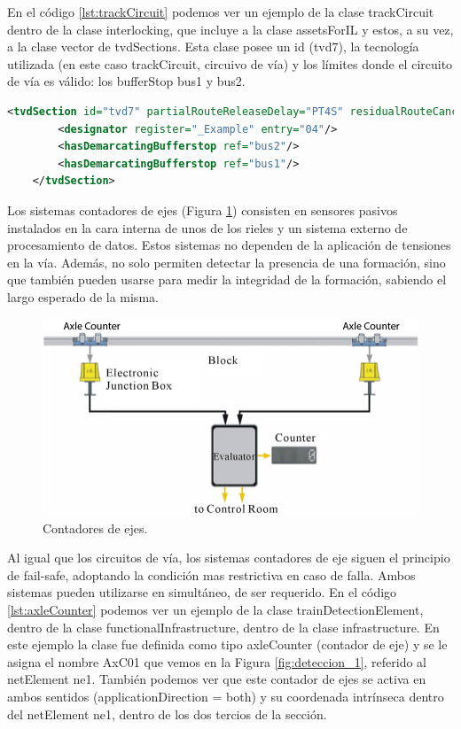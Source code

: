     En el código \ref{lst:trackCircuit} podemos ver un ejemplo de la clase trackCircuit dentro de la clase interlocking, que incluye a la clase assetsForIL y estos, a su vez, a la clase vector de tvdSections. Esta clase posee un id (tvd7), la tecnología utilizada (en este caso trackCircuit, circuivo de vía) y los límites donde el circuito de vía es válido: los bufferStop bus1 y bus2.

    \begin{lstlisting}[language = XML, caption = Clase trackCircuit , label = {lst:trackCircuit}]
    <tvdSection id="tvd7" partialRouteReleaseDelay="PT4S" residualRouteCancellationDelay="PT90S" technology="trackCircuit" isBerthingTrack="false">
        <designator register="_Example" entry="04"/>
        <hasDemarcatingBufferstop ref="bus2"/>
        <hasDemarcatingBufferstop ref="bus1"/>
    </tvdSection>
    \end{lstlisting}

    Los sistemas contadores de ejes (Figura \ref{fig:deteccion_2}) consisten en sensores pasivos instalados en la cara interna de unos de los rieles y un sistema externo de procesamiento de datos. Estos sistemas no dependen de la aplicación de tensiones en la vía. Además, no solo permiten detectar la presencia de una formación, sino que también pueden usarse para medir la integridad de la formación, sabiendo el largo esperado de la misma. 

    \begin{figure}[!h]
        \centering
        \includegraphics[width=1\textwidth]{Figuras/contador.jpg}
        \centering\caption{Contadores de ejes.}
        \label{fig:deteccion_2}
    \end{figure}

    Al igual que los circuitos de vía, los sistemas contadores de eje siguen el principio de fail-safe, adoptando la condición mas restrictiva en caso de falla. Ambos sistemas pueden utilizarse en simultáneo, de ser requerido. En el código \ref{lst:axleCounter} podemos ver un ejemplo de la clase trainDetectionElement, dentro de la clase functionalInfrastructure, dentro de la clase infrastructure. En este ejemplo la clase fue definida como tipo axleCounter (contador de eje) y se le asigna el nombre AxC01 que vemos en la Figura \ref{fig:deteccion_1}, referido al netElement ne1. También podemos ver que este contador de ejes se activa en ambos sentidos (applicationDirection = both) y su coordenada intrínseca dentro del netElement ne1, dentro de los dos tercios de la sección.

